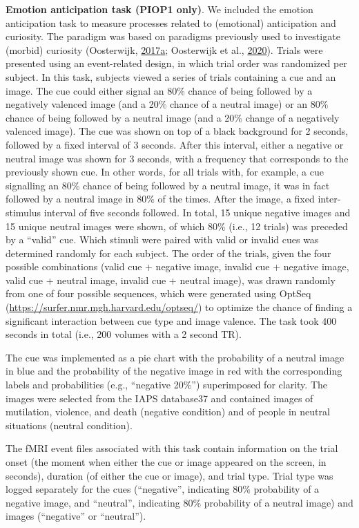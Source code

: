 \documentclass[11pt,american,a4paper,oneside,]{memoir} %
\begin{document}
\textbf{Emotion anticipation task (PIOP1 only)}. We included the emotion anticipation task to measure processes related to (emotional) anticipation and curiosity. The paradigm was based on paradigms previously used to investigate (morbid) curiosity (Oosterwijk, \protect\hyperlink{ref-oosterwijk2017choosing}{2017}\protect\hyperlink{ref-oosterwijk2017choosing}{a}; Oosterwijk et al., \protect\hyperlink{ref-Oosterwijk2020-uf}{2020}). Trials were presented using an event-related design, in which trial order was randomized per subject. In this task, subjects viewed a series of trials containing a cue and an image. The cue could either signal an 80\% chance of being followed by a negatively valenced image (and a 20\% chance of a neutral image) or an 80\% chance of being followed by a neutral image (and a 20\% change of a negatively valenced image). The cue was shown on top of a black background for 2 seconds, followed by a fixed interval of 3 seconds. After this interval, either a negative or neutral image was shown for 3 seconds, with a frequency that corresponds to the previously shown cue. In other words, for all trials with, for example, a cue signalling an 80\% chance of being followed by a neutral image, it was in fact followed by a neutral image in 80\% of the times. After the image, a fixed inter-stimulus interval of five seconds followed. In total, 15 unique negative images and 15 unique neutral images were shown, of which 80\% (i.e., 12 trials) was preceded by a ``valid'' cue. Which stimuli were paired with valid or invalid cues was determined randomly for each subject. The order of the trials, given the four possible combinations (valid cue + negative image, invalid cue + negative image, valid cue + neutral image, invalid cue + neutral image), was drawn randomly from one of four possible sequences, which were generated using OptSeq (\url{https://surfer.nmr.mgh.harvard.edu/optseq/}) to optimize the chance of finding a significant interaction between cue type and image valence. The task took 400 seconds in total (i.e., 200 volumes with a 2 second TR).

The cue was implemented as a pie chart with the probability of a neutral image in blue and the probability of the negative image in red with the corresponding labels and probabilities (e.g., ``negative 20\%'') superimposed for clarity. The images were selected from the IAPS database37 and contained images of mutilation, violence, and death (negative condition) and of people in neutral situations (neutral condition).

The fMRI event files associated with this task contain information on the trial onset (the moment when either the cue or image appeared on the screen, in seconds), duration (of either the cue or image), and trial type. Trial type was logged separately for the cues (``negative'', indicating 80\% probability of a negative image, and ``neutral'', indicating 80\% probability of a neutral image) and images (``negative'' or ``neutral'').
\end{document}
